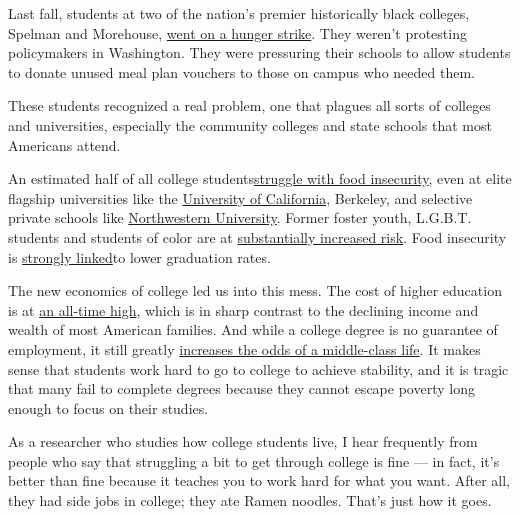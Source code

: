 Last fall, students at two of the nation's premier historically black
colleges, Spelman and Morehouse,
\href{https://www.bustle.com/p/spelman-morehouse-students-are-going-on-hunger-strike-to-protest-food-insecurity-on-college-campuses-3242622}{went
on a hunger strike}. They weren't protesting policymakers in Washington.
They were pressuring their schools to allow students to donate unused
meal plan vouchers to those on campus who needed them.

These students recognized a real problem, one that plagues all sorts of
colleges and universities, especially the community colleges and state
schools that most Americans attend.

An estimated half of all college
students\href{http://journals.sagepub.com/doi/abs/10.3102/0013189X17741303?ai=1gvoi\&mi=3ricys\&af=R}{struggle
with food insecurity}, even at elite flagship universities like the
\href{https://alumni.berkeley.edu/california-magazine/just-in/2016-05-11/hunger-uc-berkeley-sizeable-share-students-are-financially}{University
of California}, Berkeley, and selective private schools like
\href{http://www.swipehunger.org/northwestern}{Northwestern University}.
Former foster youth, L.G.B.T. students and students of color are at
\href{http://www.ucop.edu/global-food-initiative/_files/food-housing-security.pdf}{substantially
increased risk}. Food insecurity is
\href{http://www.tandfonline.com/doi/full/10.1080/00091383.2016.1121081?scroll=top\&needAccess=true\&}{strongly
linked}to lower graduation rates.

The new economics of college led us into this mess. The cost of higher
education is at
\href{http://time.com/money/4543839/college-costs-record-2016/}{an
all-time high}, which is in sharp contrast to the declining income and
wealth of most American families. And while a college degree is no
guarantee of employment, it still greatly
\href{https://cew.georgetown.edu/cew-reports/americas-divided-recovery/}{increases
the odds of a middle-class life}. It makes sense that students work hard
to go to college to achieve stability, and it is tragic that many fail
to complete degrees because they cannot escape poverty long enough to
focus on their studies.

As a researcher who studies how college students live, I hear frequently
from people who say that struggling a bit to get through college is fine
--- in fact, it's better than fine because it teaches you to work hard
for what you want. After all, they had side jobs in college; they ate
Ramen noodles. That's just how it goes.

